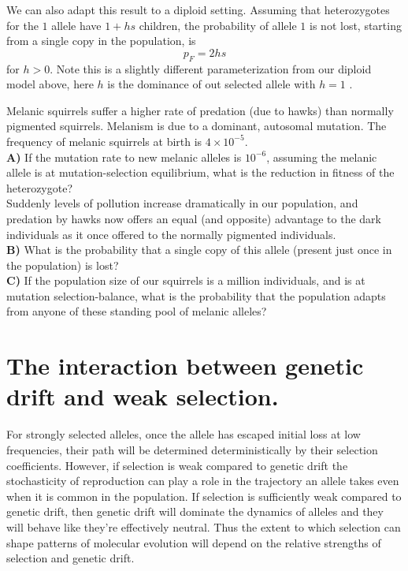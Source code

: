 We can also adapt this result to a diploid setting.
Assuming that heterozygotes for the $1$ allele have $1+hs$ children, the
probability of allele $1$ is not lost, starting from a single copy in
the population, is
\begin{equation}
p_F = 2 h s \label{eqn:diploid_escape}
\end{equation}
for $h>0$. Note this is a slightly different parameterization from
our diploid model above, here $h$ is the dominance of out selected
allele with $h=1$ .\\


\begin{question}
Melanic squirrels suffer a higher rate of predation (due to hawks) than normally pigmented squirrels. Melanism is due to a dominant, autosomal mutation. The frequency of melanic squirrels at birth is $4 \times 10^{-5}$.\\

{\bf A)} If the mutation rate to new melanic alleles is $10^{-6}$,
assuming the melanic allele is at mutation-selection equilibrium, what
is the reduction in fitness of the heterozygote? \\ 
Suddenly levels of pollution increase dramatically in our population,
and predation by hawks now offers an equal (and opposite) advantage to
the dark individuals as it once offered to the normally pigmented
individuals. \\
{\bf B)} What is the probability that a single copy of this allele
(present just once in the population) is lost?\\ 
{\bf C)}  If the population size of our squirrels is a million
individuals, and is at mutation selection-balance, what is the probability that the population adapts from
anyone of these standing pool of melanic alleles?  
\end{question}

\section{The interaction between genetic drift and weak selection.}
For strongly selected alleles, once the allele has escaped initial
loss at low frequencies, their path will be determined deterministically by their
selection coefficients. However, if selection is weak compared to
genetic drift the stochasticity of reproduction can play a role in the trajectory an
allele takes even when it is common in the population. If selection is
sufficiently weak compared to genetic drift, then genetic drift will dominate the dynamics of alleles
and they will behave like they're effectively neutral. Thus the extent
to which selection can shape patterns of molecular evolution will
depend on the relative strengths of selection and genetic drift.


